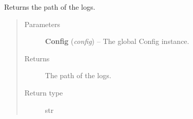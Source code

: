 \documentclass[a4paper,10pt,english]{sphinxmanual}
\begin{document}

\begin{fulllineitems}
\label{commands/apidoc/src:src.__init__.get_log_path}
Returns the path of the logs.
\begin{quote}\begin{description}
\item[{Parameters}] \leavevmode
\textbf{Config} (\emph{config}) -- The global Config instance.

\item[{Returns}] \leavevmode
The path of the logs.

\item[{Return type}] \leavevmode
str

\end{description}\end{quote}

\end{fulllineitems}


\begin{fulllineitems}
\label{commands/apidoc/src:src.__init__.get_property_in_product_cfg}
\end{fulllineitems}


\begin{fulllineitems}
\label{commands/apidoc/src:src.__init__.get_salome_version}
\end{fulllineitems}


\begin{fulllineitems}
\label{commands/apidoc/src:src.__init__.get_tmp_filename}
\end{fulllineitems}


\begin{fulllineitems}
\label{commands/apidoc/src:src.__init__.handleRemoveReadonly}
\end{fulllineitems}
\end{document}
